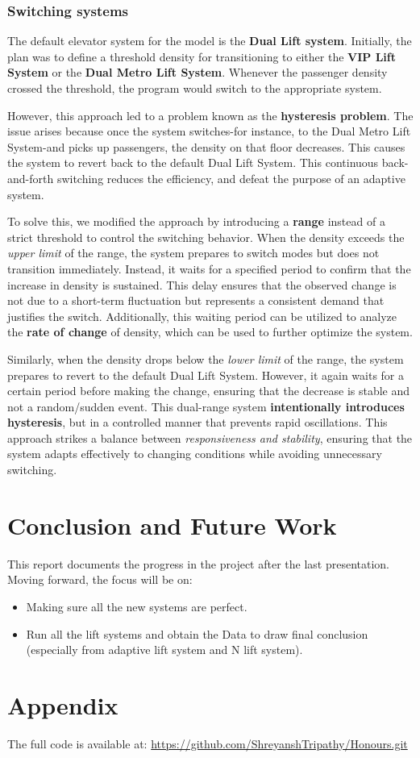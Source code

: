 \documentclass[12pt,a4paper]{report}
\begin{document}
\subsection{Switching systems}
The default elevator system for the model is the \textbf{Dual Lift system}. Initially, the plan was to define a threshold density for transitioning to either the \textbf{VIP Lift System} or the \textbf{Dual Metro Lift System}. Whenever the passenger density crossed the threshold, the program would switch to the appropriate system.

However, this approach led to a problem known as the \textbf{hysteresis problem}. The issue arises because once the system switches-for instance, to the Dual Metro Lift System-and picks up passengers, the density on that floor decreases. This causes the system to revert back to the default Dual Lift System. This continuous back-and-forth switching reduces the efficiency, and defeat the purpose of an adaptive system.

To solve this, we modified the approach by introducing a \textbf{range} instead of a strict threshold to control the switching behavior. When the density exceeds the \textit{upper limit} of the range, the system prepares to switch modes but does not transition immediately. Instead, it waits for a specified period to confirm that the increase in density is sustained. This delay ensures that the observed change is not due to a short-term fluctuation but represents a consistent demand that justifies the switch. Additionally, this waiting period can be utilized to analyze the \textbf{rate of change} of density, which can be used to further optimize the system.

Similarly, when the density drops below the \textit{lower limit} of the range, the system prepares to revert to the default Dual Lift System. However, it again waits for a certain period before making the change, ensuring that the decrease is stable and not a random/sudden event. This dual-range system \textbf{intentionally introduces hysteresis}, but in a controlled manner that prevents rapid oscillations. This approach strikes a balance between \textit{responsiveness and stability}, ensuring that the system adapts effectively to changing conditions while avoiding unnecessary switching.

\chapter{Conclusion and Future Work}
This report documents the progress in the project after the last presentation. Moving forward, the focus will be on:
\begin{itemize}
    \item Making sure all the new systems are perfect.
    \item Run all the lift systems and obtain the Data to draw final conclusion (especially from adaptive lift system and N lift system).
\end{itemize}

\appendix
\chapter{Appendix}
The full code is available at:
\url{https://github.com/ShreyanshTripathy/Honours.git}
\end{document}
